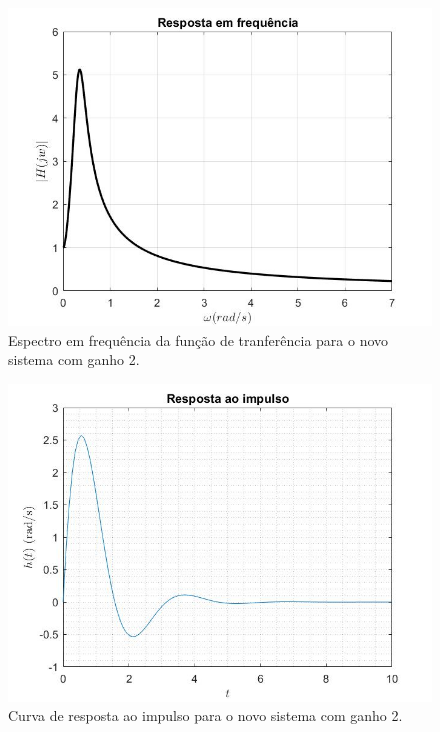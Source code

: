 \documentclass[a4paper,12pt,oneside,openany,table,xcdraw]{article}
\begin{document}
\vspace{2cm}
\begin{figure}[H]
\centering
\includegraphics[width=14cm]{ex3-Hjw2}
\caption{Espectro em frequência da função de tranferência para o novo sistema com ganho 2.}
\label{ex3:Hjw:F}
\end{figure}

\vspace{0.2cm}
\begin{figure}[H]
\centering
\includegraphics[width=14cm]{ex3-ht2}
\caption{Curva de resposta ao impulso para o novo sistema com ganho 2.}
\label{ex3:ht:F}
\end{figure}
\end{document}
